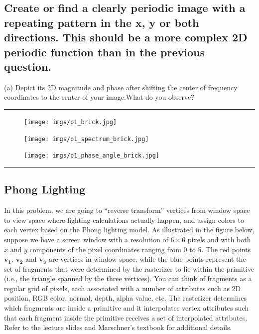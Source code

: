 \documentclass[conference]{styles/acmsiggraph}
\renewcommand{\vec}[1]{\mathbf{#1}}
\newenvironment{answer}{}{}
\newcommand{\points}[1]{\hfill \normalfont{(\textit{#1pts})}}
\begin{document}
\subsection{Create or find a clearly periodic image with a repeating pattern in the x, y or both directions. This
should be a more complex 2D periodic function than in the previous question.}
(a) Depict its 2D magnitude and phase after shifting the center of frequency coordinates to the
center of your image.What do you observe?

\begin{answer}
	\rule{\textwidth}{0.4pt}
	\begin{figure}[H]
	\centering
	\texttt{[image: imgs/p1\_brick.jpg]}
	\end{figure}	
	\begin{figure}[H]
	\centering
	\texttt{[image: imgs/p1\_spectrum\_brick.jpg]}
	\end{figure}	
	\begin{figure}[H]
	\centering
	\texttt{[image: imgs/p1\_phase\_angle\_brick.jpg]}
	\end{figure}	
	\rule{\textwidth}{0.4pt}
\end{answer}


\newpage
\subsection{Phong Lighting \points{30}}
In this problem, we are going to ``reverse transform'' vertices from window space to view space where lighting calculations actually happen, and assign colors to each vertex based on the Phong lighting model.
As illustrated in the figure below, suppose we have a screen window with a resolution of $6\times6$ pixels and with both $x$ and $y$ components of the pixel coordinates ranging from 0 to 5. The red points $\vec{v_1}$, $\vec{v_2}$ and $\vec{v_3}$ are vertices in window space, while the blue points represent the set of fragments that were determined by the rasterizer to lie within the primitive (i.e., the triangle spanned by the three vertices). You can think of fragments as a regular grid of pixels, each associated with a number of attributes such as 2D position, RGB color, normal, depth, alpha value, etc. The rasterizer determines which fragments are inside a primitive and it interpolates vertex attributes such that each fragment inside the primitive receives a set of interpolated attributes. Refer to the lecture slides and Marschner's textbook for additional details.
\end{document}
